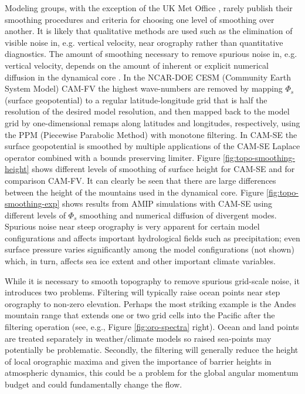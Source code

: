 \documentclass[gmd]{copernicus}
\begin{document}
Modeling groups, with the exception of the UK Met Office \citep{WBCJ2003QJRMS}, rarely publish their smoothing procedures and criteria for choosing one level of smoothing over another. It is likely that qualitative methods are used such as the elimination of visible noise in, e.g. vertical velocity, near orography rather than quantitative diagnostics. The amount of smoothing necessary to remove spurious noise in, e.g. vertical velocity, depends on the amount of inherent or explicit numerical diffusion in the dynamical core \citep[e.g., ][]{L2011IJHPC}. In the NCAR-DOE CESM (Community Earth System Model) CAM-FV \citep[Community Atmosphere Model - Finite-Volume; ][]{L2004MWR} the highest wave-numbers are removed by mapping $\Phi_s$ (surface geopotential) to a regular latitude-longitude grid that is half the resolution of the desired model resolution, and then mapped back to the model grid by one-dimensional remaps along latitudes and longitudes, respectively, using the PPM (Piecewise Parabolic Method) with monotone filtering. In CAM-SE \citep[Community Atmosphere Model - Spectral-Elements;][]{DetAl2012IJHPCA,CAM5} the surface geopotential is smoothed by multiple applications of the CAM-SE Laplace operator combined with a bounds preserving limiter. Figure \ref{fig:topo-smoothing-height} shows different levels of smoothing of surface height for CAM-SE and for comparison CAM-FV. It can clearly be seen that there are large differences between the height of the mountains used in the dynamical core. Figure \ref{fig:topo-smoothing-exp} shows results from AMIP simulations with CAM-SE using different levels of $\Phi_s$ smoothing and numerical diffusion of divergent modes. Spurious noise near steep orography is very apparent for certain model configurations and affects important hydrological fields such as precipitation; even surface pressure varies significantly among the model configurations (not shown) which, in turn, affects sea ice extent and other important climate variables. 

While it is necessary to smooth topography to remove spurious grid-scale noise, it introduces two problems. Filtering will typically raise ocean points near step orography to non-zero elevation. Perhaps the most striking example is the Andes mountain range that extends one or two grid cells into the Pacific after the filtering operation (see, e.g., Figure \ref{fig:oro-spectra} right). Ocean and land points are treated separately in weather/climate models so raised sea-points may potentially be problematic. Secondly, the filtering will generally reduce the height of local orographic maxima and given the importance of barrier heights in atmospheric dynamics, this could be a problem for the global angular momentum budget and could fundamentally change the flow. 
\end{document}
